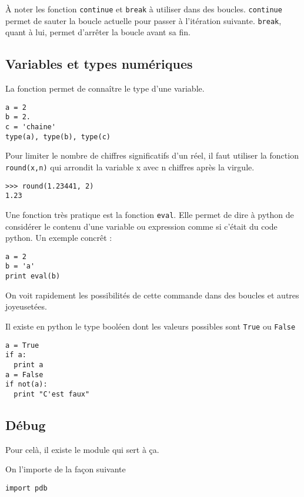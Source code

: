 \documentclass[a4paper,twoside]{article}
\begin{document}
\begin{remarque}
À noter les fonction \texttt{continue} et \texttt{break} à utiliser dans des boucles. \texttt{continue} permet de sauter la boucle actuelle pour passer à l'itération suivante. \texttt{break}, quant à lui, permet d'arrêter la boucle avant sa fin.
\end{remarque}



\subsection{Variables et types numériques}

La fonction  permet de connaître le type d'une variable.
\begin{verbatim}
a = 2
b = 2.
c = 'chaine'
type(a), type(b), type(c)
\end{verbatim}

Pour limiter le nombre de chiffres significatifs d'un réel, il faut utiliser la fonction \texttt{round(x,n)} qui arrondit la variable x avec n chiffres après la virgule.
\begin{verbatim}
>>> round(1.23441, 2)
1.23
\end{verbatim}

Une fonction très pratique est la fonction \texttt{eval}. Elle permet de dire à python de considérer le contenu d'une variable ou expression comme si c'était du code python. Un exemple concrêt :
\begin{verbatim}
a = 2
b = 'a'
print eval(b)
\end{verbatim}

On voit rapidement les possibilités de cette commande dans des boucles et autres joyeusetées.

\bigskip

Il existe en python le type booléen dont les valeurs possibles sont \texttt{True} ou \texttt{False}
\begin{verbatim}
a = True
if a:
  print a
a = False
if not(a):
  print "C'est faux"
\end{verbatim}

\subsection{Débug}
Pour celà, il existe le module  qui sert à ça.

On l'importe de la façon suivante
\begin{verbatim}
import pdb
\end{verbatim}
\end{document}
